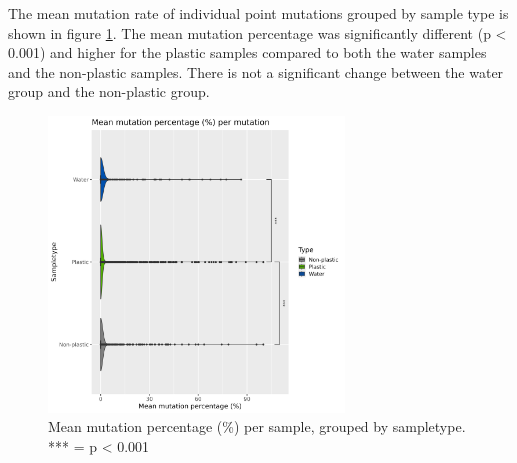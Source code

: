 The mean mutation rate of individual point mutations grouped by sample type is shown in figure \ref{mean_genes_sampletype}. The mean mutation percentage was significantly different (p < 0.001) and higher for the plastic samples compared to both the water samples and the non-plastic samples. There is not a significant change between the water group and the non-plastic group.

\begin{figure}[h!]
    \centering
    \includegraphics[width = 0.7\textwidth]{figure/mean_genes_sampletype.png}
    \caption{Mean mutation percentage (\%) per sample, grouped by sampletype. *** = p < 0.001}
    \label{mean_genes_sampletype}
\end{figure}

